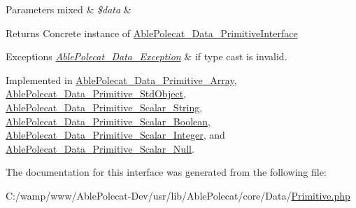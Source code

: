 \begin{DoxyParams}[1]{Parameters}
mixed & {\em \$data} & \\
\hline
\end{DoxyParams}
\begin{DoxyReturn}{Returns}
Concrete instance of \hyperlink{interface_able_polecat___data___primitive_interface}{Able\+Polecat\+\_\+\+Data\+\_\+\+Primitive\+Interface} 
\end{DoxyReturn}

\begin{DoxyExceptions}{Exceptions}
{\em \hyperlink{class_able_polecat___data___exception}{Able\+Polecat\+\_\+\+Data\+\_\+\+Exception}} & if type cast is invalid. \\
\hline
\end{DoxyExceptions}


Implemented in \hyperlink{class_able_polecat___data___primitive___array_a68640750b79d1cdda3cddcece68a207e}{Able\+Polecat\+\_\+\+Data\+\_\+\+Primitive\+\_\+\+Array}, \hyperlink{class_able_polecat___data___primitive___std_object_a68640750b79d1cdda3cddcece68a207e}{Able\+Polecat\+\_\+\+Data\+\_\+\+Primitive\+\_\+\+Std\+Object}, \hyperlink{class_able_polecat___data___primitive___scalar___string_a68640750b79d1cdda3cddcece68a207e}{Able\+Polecat\+\_\+\+Data\+\_\+\+Primitive\+\_\+\+Scalar\+\_\+\+String}, \hyperlink{class_able_polecat___data___primitive___scalar___boolean_a68640750b79d1cdda3cddcece68a207e}{Able\+Polecat\+\_\+\+Data\+\_\+\+Primitive\+\_\+\+Scalar\+\_\+\+Boolean}, \hyperlink{class_able_polecat___data___primitive___scalar___integer_a68640750b79d1cdda3cddcece68a207e}{Able\+Polecat\+\_\+\+Data\+\_\+\+Primitive\+\_\+\+Scalar\+\_\+\+Integer}, and \hyperlink{class_able_polecat___data___primitive___scalar___null_a68640750b79d1cdda3cddcece68a207e}{Able\+Polecat\+\_\+\+Data\+\_\+\+Primitive\+\_\+\+Scalar\+\_\+\+Null}.



The documentation for this interface was generated from the following file\+:\begin{DoxyCompactItemize}
\item 
C\+:/wamp/www/\+Able\+Polecat-\/\+Dev/usr/lib/\+Able\+Polecat/core/\+Data/\hyperlink{_primitive_8php}{Primitive.\+php}\end{DoxyCompactItemize}
